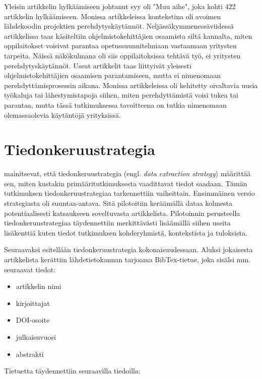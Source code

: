 \documentclass[utf8]{gradu3}
\begin{document}
Yleisin artikkelin hylkäämiseen johtanut syy oli "Muu aihe", joka kohti 422 artikkelin hylkäämiseen. Monissa artikkeleissa kontekstina oli avoimen lähdekoodin projektien perehdytyskäytännöt. Neljässäkymmenessäviidessä artikkelissa taas käsiteltiin ohjelmistokehittäjien osaamista siltä kannalta, miten oppilaitokset voisivat parantaa opetussuunnitelmiaan vastaamaan yritysten tarpeita. Näissä näkökulmana oli siis oppilaitoksissa tehtävä työ, ei yritysten perehdytyskäytännöt. Useat artikkelit taas liittyivät yleisesti ohjelmistokehittäjien osaamisen parantamiseen, mutta ei nimenomaan perehdyttämisprosessin aikana. Monissa artikkeleissa oli kehitetty oivaltavia uusia työkaluja tai lähestymistapoja siihen, miten perehdyttämistä voisi tukea tai parantaa, mutta tässä tutkimuksessa tavoitteena on tutkia nimenomaan olemassaolevia käytäntöjä yrityksissä.

\section{Tiedonkeruustrategia}
\label{luku-tiedonkeruustrategia}

\textcite{kitchenham-charters-2007} mainitsevat, että tiedonkeruustrategia (engl. \textit{data extraction strategy}) määrittää sen, miten kustakin primääritutkimuksesta vaadittavat tiedot saadaan. Tämän tutkimuksen tiedonkeruustrategiaa tarkennettiin vaiheittain. Ensimmäinen versio strategiasta oli suuntaa-antava. Sitä pilotoitiin keräämällä dataa kolmesta potentiaalisesti katsaukseen soveltuvasta artikkelista. Pilotoinnin perusteella tiedonkeruustrategiaa täydennettiin merkittävästi lisäämällä siihen useita lisäkenttiä kuten tiedot tutkimuksen kohderyhmistä, kontekstista ja tuloksista.

Seuraavaksi esitellään tiedonkeruustrategia kokonaisuudessaan. Aluksi jokaisesta artikkelista kerättiin lähdetietokannan tarjoama BibTex-tietue, joka sisälsi mm. seuraavat tiedot:

\begin{itemize}
    \item artikkelin nimi
    \item kirjoittajat
    \item DOI-osoite
    \item julkaisuvuosi
    \item abstrakti
\end{itemize}

Tietuetta täydennettiin seuraavilla tiedoilla:
\end{document}

